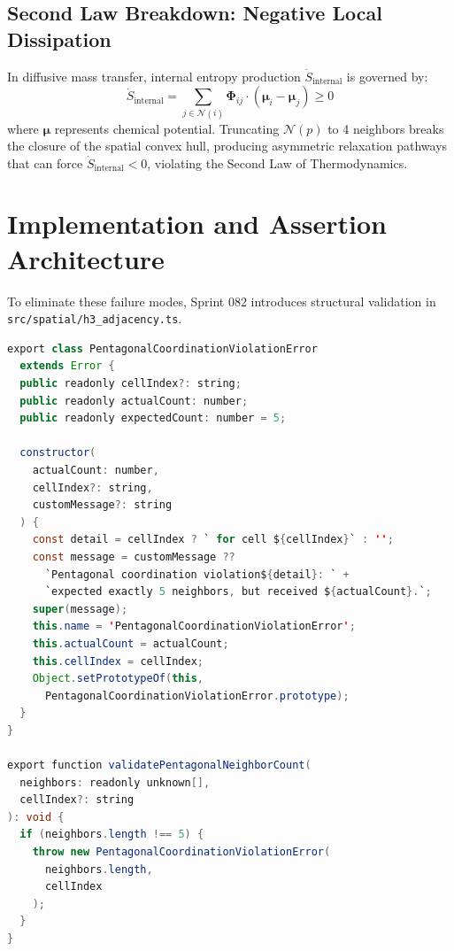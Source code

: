 \documentclass[10pt,twocolumn,letterpaper]{article}
\theoremstyle{definition}
\begin{document}
\subsection{Second Law Breakdown: Negative Local Dissipation}
In diffusive mass transfer, internal entropy production $\dot{S}_{\mathrm{internal}}$ is governed by:
\begin{equation}
\dot{S}_{\mathrm{internal}} = \sum_{j \in \mathcal{N}(i)} \mathbf{\Phi}_{ij} \cdot (\boldsymbol{\mu}_i - \boldsymbol{\mu}_j) \ge 0
\end{equation}
where $\boldsymbol{\mu}$ represents chemical potential. Truncating $\mathcal{N}(p)$ to 4 neighbors breaks the closure of the spatial convex hull, producing asymmetric relaxation pathways that can force $\dot{S}_{\mathrm{internal}} < 0$, violating the Second Law of Thermodynamics.

\section{Implementation and Assertion Architecture}

To eliminate these failure modes, Sprint 082 introduces structural validation in \texttt{src/spatial/h3\_adjacency.ts}.

\begin{lstlisting}[language=Java, caption={Pentagonal Coordination Validation in TypeScript}]
export class PentagonalCoordinationViolationError 
  extends Error {
  public readonly cellIndex?: string;
  public readonly actualCount: number;
  public readonly expectedCount: number = 5;

  constructor(
    actualCount: number, 
    cellIndex?: string, 
    customMessage?: string
  ) {
    const detail = cellIndex ? ` for cell ${cellIndex}` : '';
    const message = customMessage ?? 
      `Pentagonal coordination violation${detail}: ` +
      `expected exactly 5 neighbors, but received ${actualCount}.`;
    super(message);
    this.name = 'PentagonalCoordinationViolationError';
    this.actualCount = actualCount;
    this.cellIndex = cellIndex;
    Object.setPrototypeOf(this, 
      PentagonalCoordinationViolationError.prototype);
  }
}

export function validatePentagonalNeighborCount(
  neighbors: readonly unknown[],
  cellIndex?: string
): void {
  if (neighbors.length !== 5) {
    throw new PentagonalCoordinationViolationError(
      neighbors.length, 
      cellIndex
    );
  }
}
\end{lstlisting}
\end{document}
